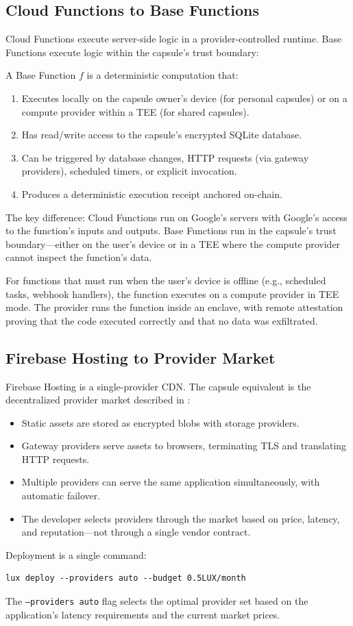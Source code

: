 \subsection{Cloud Functions to Base Functions}

Cloud Functions execute server-side logic in a provider-controlled
runtime. Base Functions execute logic within the capsule's trust
boundary:

\begin{definition}
A Base Function $f$ is a deterministic computation that:
\begin{enumerate}
    \item Executes locally on the capsule owner's device (for personal capsules)
    or on a compute provider within a TEE (for shared capsules).
    \item Has read/write access to the capsule's encrypted SQLite database.
    \item Can be triggered by database changes, HTTP requests (via gateway
    providers), scheduled timers, or explicit invocation.
    \item Produces a deterministic execution receipt anchored on-chain.
\end{enumerate}
\end{definition}

The key difference: Cloud Functions run on Google's servers with Google's
access to the function's inputs and outputs. Base Functions run in the
capsule's trust boundary---either on the user's device or in a TEE where
the compute provider cannot inspect the function's data.

For functions that must run when the user's device is offline (e.g.,
scheduled tasks, webhook handlers), the function executes on a compute
provider in TEE mode. The provider runs the function inside an enclave,
with remote attestation proving that the code executed correctly and that
no data was exfiltrated.

\subsection{Firebase Hosting to Provider Market}

Firebase Hosting is a single-provider CDN. The capsule equivalent is
the decentralized provider market described in \cite{kelling2026cloud}:

\begin{itemize}
    \item Static assets are stored as encrypted blobs with storage providers.
    \item Gateway providers serve assets to browsers, terminating TLS and
    translating HTTP requests.
    \item Multiple providers can serve the same application simultaneously,
    with automatic failover.
    \item The developer selects providers through the market based on
    price, latency, and reputation---not through a single vendor contract.
\end{itemize}

Deployment is a single command:

\begin{lstlisting}
lux deploy --providers auto --budget 0.5LUX/month
\end{lstlisting}

The \texttt{--providers auto} flag selects the optimal provider set based
on the application's latency requirements and the current market prices.


